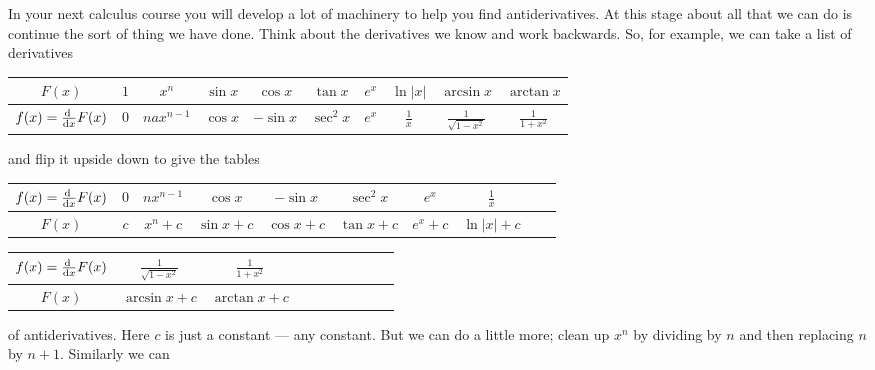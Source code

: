 In your next calculus course you will develop a lot of machinery
to help you find antiderivatives. At this stage about all that we can
do is continue the sort of thing we have done. Think about the derivatives we know and
work backwards. So, for example, we can take a list of derivatives
\renewcommand{\arraystretch}{1.3}
\begin{center}
     \begin{tabular}{|c||c|c|c|c|c|c|c|c|c|}
          \hline
                  $F(x)$ &   $1$ &  $x^n$ & $\sin x$ & $\cos x$
                  & $\tan x$ & $e^x$ & $\ln |x|$
                  & $\arcsin x$ & $\arctan x$
           \\ \hline
                  $f(x)=\diff{}{x}F(x)$ & $0$ & $nax^{n-1}$ & $\cos x$
                  & $-\sin x$
                  &  $\sec^2 x$ & $e^x$ & $\frac{1}{x}$
                  & $\frac{1}{\sqrt{1-x^2}}$ & $\frac{1}{1+x^2}$
           \\ \hline
     \end{tabular}
\end{center}
\renewcommand{\arraystretch}{1.0}
and flip it upside down to give the tables
\renewcommand{\arraystretch}{1.3}
\begin{center}
     \begin{tabular}{|c||c|c|c|c|c|c|c|c|c|}
          \hline
                  $f(x)=\diff{}{x}F(x)$ & $0$ & $nx^{n-1}$ & $\cos x$
                  & $-\sin x$
                  &  $\sec^2 x$ & $e^x$ & $\frac{1}{x}$
           \\ \hline
                  $F(x)$ &   $c$ &  $x^n+c$ & $\sin x+c$ & $\cos x+c$
                  & $\tan x+c$ & $e^x+c$ & $\ln |x|+c$
           \\ \hline
     \end{tabular}
\end{center}
\begin{center}
     \begin{tabular}{|c||c|c|c|c|c|c|c|c|c|}
          \hline
                  $f(x)=\diff{}{x}F(x)$
                  & $\frac{1}{\sqrt{1-x^2}}$ & $\frac{1}{1+x^2}$
           \\ \hline
                  $F(x)$
                  & $\arcsin x+c$ & $\arctan x+c$
           \\ \hline
     \end{tabular}
\end{center}
\renewcommand{\arraystretch}{1.0}
of antiderivatives. Here $c$ is just a constant --- any constant. But we can do
a little
more; clean up $x^n$ by dividing by $n$ and then replacing $n$ by $n+1$. Similarly we can

